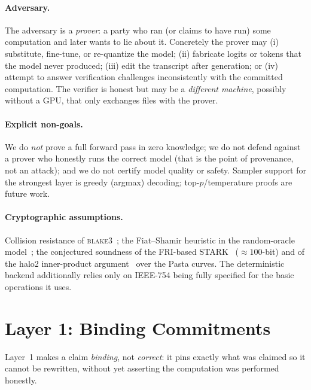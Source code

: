 \documentclass[11pt]{article}
\begin{document}
\paragraph{Adversary.} The adversary is a \emph{prover}: a party who ran (or
claims to have run) some computation and later wants to lie about it. Concretely
the prover may (i) substitute, fine-tune, or re-quantize the model; (ii)
fabricate logits or tokens that the model never produced; (iii) edit the
transcript after generation; or (iv) attempt to answer verification challenges
inconsistently with the committed computation. The verifier is honest but may be
a \emph{different machine}, possibly without a GPU, that only exchanges files
with the prover.

\paragraph{Explicit non-goals.} We do \emph{not} prove a full forward pass in
zero knowledge; we do not defend against a prover who honestly runs the correct
model (that is the point of provenance, not an attack); and we do not certify
model quality or safety. Sampler support for the strongest layer is greedy
(argmax) decoding; top-$p$/temperature proofs are future work.

\paragraph{Cryptographic assumptions.} Collision resistance of
\textsc{blake3}~\cite{blake3}; the Fiat--Shamir heuristic in the random-oracle
model~\cite{fiatshamir}; the conjectured soundness of the FRI-based
STARK~\cite{stark} ($\approx\!100$-bit) and of the halo2 inner-product
argument~\cite{bulletproofs,halo} over the Pasta curves. The deterministic
backend additionally relies only on IEEE-754 being fully specified for the basic
operations it uses.

\section{Layer 1: Binding Commitments}\label{sec:l1}

Layer~1 makes a claim \emph{binding}, not \emph{correct}: it pins exactly what
was claimed so it cannot be rewritten, without yet asserting the computation was
performed honestly.
\end{document}
